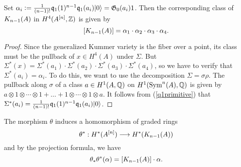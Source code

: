 \begin{proposition}\label{KummerClass}
Set $\alpha_i \defIs  \frac{1}{(n-1)!}\kq_{1}(1)^{n-1}\kq_1(a_i)\vac = \G_0(a_i)1$. Then the corresponding class of %
$\kum{A}{n-1}$ in $H^4(A\hilb{n},\Z)$ is given by
$$
[\kum{A}{n-1}]=\alpha_1\cdot\alpha_2\cdot\alpha_3\cdot\alpha_4.
$$ 
\end{proposition}
\begin{proof}
Since the generalized Kummer variety is the fiber over a point, its 
class must be the pullback of $x\in H^4(A)$ under $\Sigma$. But $\Sigma^* (x) = \Sigma^*(a_1)\cdot \Sigma^*(a_2)\cdot \Sigma^*(a_3)\cdot \Sigma^*(a_4)$, so we have to verify that $\Sigma^* (a_i) = \alpha_i$. To do this, we want to use the decomposition $\Sigma = \sigma\rho$.
The pullback along $\sigma$ of a class $a\in H^1(A,\Q)$ on $H^1(\Sym^n(A),\Q)$ 
is given by $a\otimes 1\otimes \cdots\otimes 1 + \ldots + 1\otimes \cdots\otimes 1\otimes a$. It follows from (\ref{q1primitive}) that $\Sigma^* (a_i) = \frac{1}{(n-1)!}\kq_{1}(1)^{n-1}\kq_1(a_i)\vac $.
\end{proof}
The morphism $\theta$ induces a homomorphism of graded rings
\begin{equation}
\theta^* :H^*(A\hilb{n})\longrightarrow H^*(\kum{A}{n-1})
\end{equation}
and by the projection formula, we have
\begin{equation}\label{projectionFormula}
\theta_*\theta^*(\alpha)  = [\kum{A}{n-1}]\cdot\alpha.
\end{equation}

